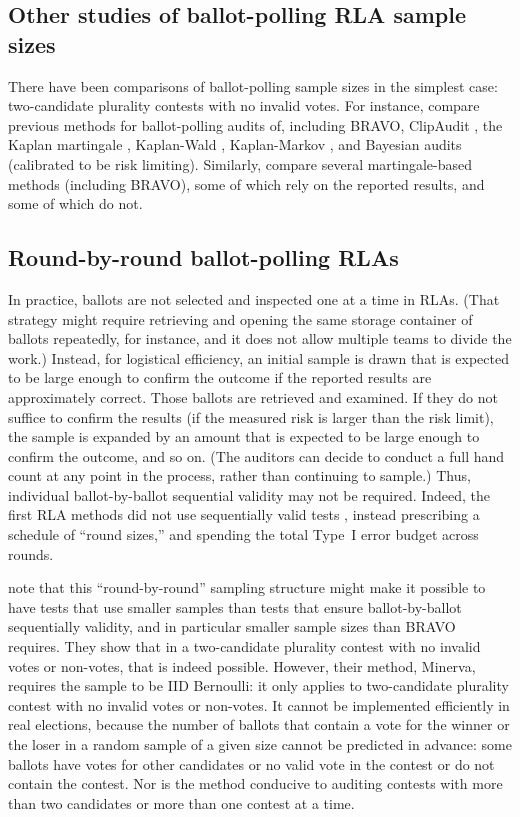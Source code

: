 \documentclass[12pt,runningheads]{llncs}
\begin{document}
{\subsection{Other studies of ballot-polling RLA sample sizes}
There have been comparisons of ballot-polling sample sizes in the simplest case:
two-candidate plurality contests with no invalid votes.
For instance,
\cite{huangEtal20} compare previous methods for ballot-polling audits of, including BRAVO, ClipAudit \cite{rivest17}, the Kaplan martingale \cite{stark20}, 
Kaplan-Wald \cite{stark20}, Kaplan-Markov \cite{stark09,stark20}, and Bayesian audits \cite{rivestShen12,rivest18} 
(calibrated to be risk limiting).
Similarly, \cite{waudby-smithEtal21} compare several martingale-based methods (including BRAVO), some of which
rely on the reported results, and some of which do not.

\subsection{Round-by-round ballot-polling RLAs}
In practice, ballots are not selected and inspected one at a time in RLAs.
(That strategy might require retrieving and opening the same storage container of ballots repeatedly, for instance, and it does not allow
multiple teams to divide the work.)
Instead, for logistical efficiency, an initial sample is drawn that is expected to be large enough to confirm the outcome if the 
reported results are approximately correct.
Those ballots are retrieved and examined.
If they do not suffice to confirm the results (if the measured risk is larger than the risk limit), 
the sample is expanded by an amount that is expected to be large enough
to confirm the outcome, and so on.
(The auditors can decide to conduct a full hand count at any point in the process, rather than continuing to sample.)
Thus, individual ballot-by-ballot sequential validity may not be required.
Indeed, the first RLA methods did not use sequentially valid tests \cite{stark08a,stark09a},
instead prescribing a schedule of ``round sizes,'' and spending the total Type~I error budget across rounds.

\cite{zagorskiEtal21} note that this ``round-by-round'' sampling structure might make it possible to have tests that 
use smaller samples than tests that ensure ballot-by-ballot sequentially validity, and in particular smaller sample sizes than BRAVO
requires.
They show that in a two-candidate plurality contest with no invalid votes or non-votes, that is indeed
possible.
However, their method, Minerva, requires the sample to be IID Bernoulli:
it only applies to  two-candidate plurality contest with no invalid votes or non-votes.
It cannot be implemented efficiently in real elections, because the number of ballots that contain a vote for the winner or the
loser in a random sample of a given size cannot be predicted in advance: some ballots have votes for other candidates or no valid vote in the contest or do not contain the contest.
Nor is the method conducive to auditing contests with more than two candidates or more than one contest at a time.

}
\end{document}
